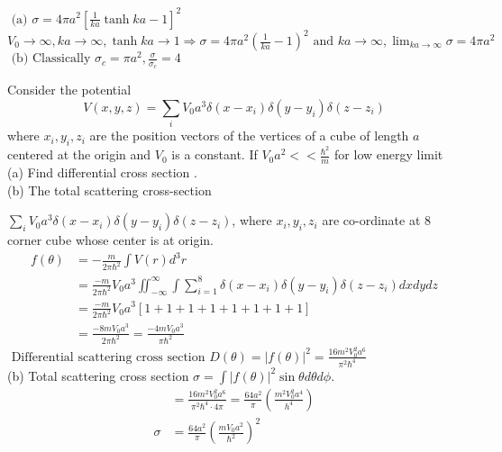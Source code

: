 \begin{enumerate}
\begin{answer}
	$\text { (a) } \sigma=4 \pi a^{2}\left[\frac{1}{k a} \tanh k a-1\right]^{2}$\\
	$V_{0} \rightarrow \infty, k a \rightarrow \infty, \tanh k a \rightarrow 1 \Rightarrow \sigma=4 \pi a^{2}\left(\frac{1}{k a}-1\right)^{2} \text { and } k a \rightarrow \infty, \lim _{k a \rightarrow \infty} \sigma=4 \pi a^{2}$\\
	$\text { (b) Classically } \sigma_{c}=\pi a^{2}, \frac{\sigma}{\sigma_{c}}=4$
\end{answer}
	\begin{minipage}{\textwidth}
	\item Consider the potential
	$$
	V(x, y, z)=\sum_{i} V_{0} a^{3} \delta\left(x-x_{i}\right) \delta\left(y-y_{i}\right) \delta\left(z-z_{i}\right)
	$$
	where $x_{i}, y_{i}, z_{i}$ are the position vectors of the vertices of a cube of length $a$ centered at the origin and $V_{0}$ is a constant. If $V_{0} a^{2}<<\frac{\hbar^{2}}{m}$ for low energy limit\\
	(a) Find differential cross section .\\
	(b) The total scattering cross-section
\end{minipage}
\begin{answer}
	 $\sum_{i} V_{0} a^{3} \delta\left(x-x_{i}\right) \delta\left(y-y_{i}\right) \delta\left(z-z_{i}\right)$, where $x_{i}, y_{i}, z_{i}$ are co-ordinate at 8 corner cube whose center is at origin.\\
	 \begin{align*}
	 	f(\theta) &=-\frac{m}{2 \pi \hbar^{2}} \int V(r) d^{3} r \\
	 	&=\frac{-m}{2 \pi \hbar^{2}} V_{0} a^{3} \iint_{-\infty}^{\infty} \int \sum_{i=1}^{8} \delta\left(x-x_{i}\right) \delta\left(y-y_{i}\right) \delta\left(z-z_{i}\right) d x d y d z \\
	 	&=\frac{-m}{2 \pi \hbar^{2}} V_{0} a^{3}[1+1+1+1+1+1+1+1] \\
	 	&=\frac{-8 m V_{0} a^{3}}{2 \pi \hbar^{2}}=\frac{-4 m V_{0} a^{3}}{\pi \hbar^{2}}
	 \end{align*}
	 $\text { Differential scattering cross section } D(\theta)=|f(\theta)|^{2}=\frac{16 m^{2} V_{0}^{2} a^{6}}{\pi^{2} \hbar^{4}}$\\
	 (b) Total scattering cross section $\sigma=\int|f(\theta)|^{2} \sin \theta d \theta d \phi$.
	 \begin{align*}
	 &=\frac{16 m^{2} V_{0}^{2} a^{6}}{\pi^{2} \hbar^{4} \cdot 4 \pi}=\frac{64 a^{2}}{\pi}\left(\frac{m^{2} V_{0}^{2} a^{4}}{h^{4}}\right) \\
	 \sigma &=\frac{64 a^{2}}{\pi}\left(\frac{m V_{0} a^{2}}{\hbar^{2}}\right)^{2}
	 \end{align*}
\end{answer}

\end{enumerate}
